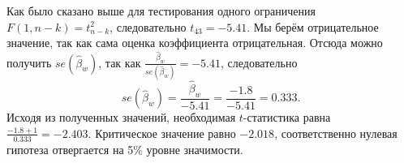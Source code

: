 \documentclass[addpoints, answers]{exam} %
\begin{document}
\begin{questions}
\begin{solution}
Как было сказано выше для тестирования одного ограничения $F(1,n-k)=t_{n-k}^{2} $, следовательно $t_{43} =-5.41$. Мы берём отрицательное значение, так как сама оценка коэффициента отрицательная. Отсюда можно получить $se(\hat{\beta }_{w} )$, так как $\frac{\hat{\beta }_{w} }{se(\hat{\beta }_{w} )} =-5.41$, следовательно
\[
se(\hat{\beta }_{w} )=\frac{\hat{\beta }_{w} }{-5.41} =\frac{-1.8}{-5.41} =0.333.
\]
Исходя из полученных значений, необходимая $t$-статистика равна $\frac{-1.8+1}{0.333} =-2.403$. Критическое значение равно  $-2.018$, соответственно нулевая гипотеза отвергается на 5\% уровне значимости.
\end{solution}




\end{questions}


\begin{comment}

\begin{figure}[b]
\caption{Distribution function of a standard normal random variable}
  \begin{minipage}[b]{0.35\linewidth}
    \centering
    \begin{tikzpicture}
    \def\normaltwo{\x,{4*1/exp(((\x-3)^2)/2)}}

    \def\y{4.4}

    \def\fy{4*1/exp(((\y-3)^2)/2)}

    \fill [fill=gray!30] (2.6,0) -- plot[domain=0:4.4] (\normaltwo) -- ({\y},0) -- cycle;

    \draw[domain=0:6] plot (\normaltwo) node[right] {};

    \draw[dashed] ({\y},{\fy}) -- ({\y},0) node[below] {$x$};

    \draw (3,2) node[below] {$F(x)$};

    \draw[->] (0,0) -- (6.2,0) node[right] {};


\end{comment}
\end{document}
